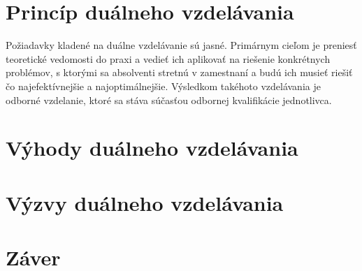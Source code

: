 \documentclass[10pt,oneside,slovak,a4paper]{article}
\begin{document}
\section{Princíp duálneho vzdelávania}
\quad Požiadavky kladené na duálne vzdelávanie sú jasné. Primárnym cieľom je preniesť teoretické vedomosti do praxi a vedieť ich aplikovať na riešenie konkrétnych problémov, s ktorými sa absolventi stretnú v zamestnaní a budú ich musieť riešiť čo najefektívnejšie a najoptimálnejšie. Výsledkom takéhoto vzdelávania je odborné vzdelanie, ktoré sa stáva súčasťou odbornej kvalifikácie jednotlivca. 

\section{Výhody duálneho vzdelávania}

\section{Výzvy duálneho vzdelávania}

\section{Záver} \label{zaver} %


\nocite{*} 

 
\end{document}
